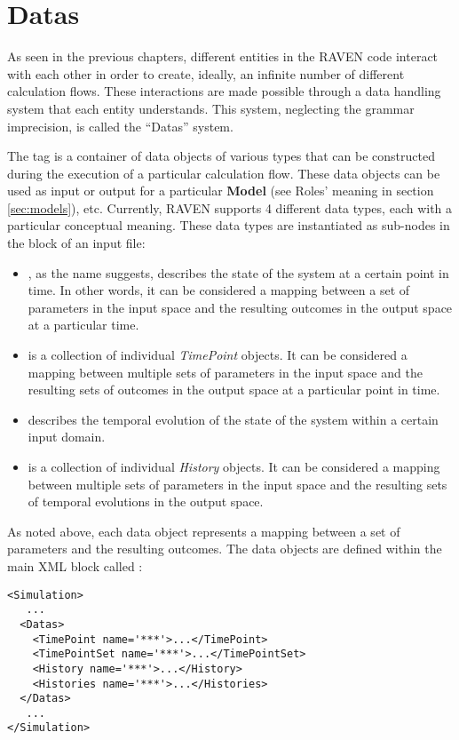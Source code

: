 \section{Datas}
\label{sec:Datas}

As seen in the previous chapters, different entities in the RAVEN
code interact with each other in order to create, ideally, an infinite number of
different calculation flows.
%
These interactions are made possible through a data handling system that each
entity understands.
%
This system, neglecting the grammar imprecision, is called the ``Datas''
system.

The  tag is a container of data objects of various types that can
be constructed during the execution of a particular calculation flow.
%
These data objects can be used as input or output for a particular
\textbf{Model} (see Roles' meaning in section \ref{sec:models}), etc.
%
Currently, RAVEN supports 4 different data types, each with a particular
conceptual meaning.
%
These data types are instantiated as sub-nodes in the  block of
an input file:
\begin{itemize}
  \item {}, as the name suggests, describes the state of the
  system at a certain point in time.
  In other words, it can be considered a mapping between a set of parameters
  in the input space and the resulting outcomes in the output space at a
  particular time.
  \item {} is a collection of individual \textit{TimePoint}
  objects.
  It can be considered a mapping between multiple sets of parameters in the
  input space and the resulting sets of outcomes in the output space at a
  particular point in time.
  \item {} describes the temporal evolution of the state of the
  system within a certain input domain.
  \item {} is a collection of individual \textit{History}
  objects.
  It can be considered a mapping between multiple sets of parameters in the
  input space and the resulting sets of temporal evolutions in the output
  space.
\end{itemize}

As noted above, each data object represents a mapping between a set of
parameters and the resulting outcomes.
%
The data objects are defined within the main XML block called :
\begin{lstlisting}[style=XML]
<Simulation>
   ...
  <Datas>
    <TimePoint name='***'>...</TimePoint>
    <TimePointSet name='***'>...</TimePointSet>
    <History name='***'>...</History>
    <Histories name='***'>...</Histories>
  </Datas>
   ...
</Simulation>
\end{lstlisting}


